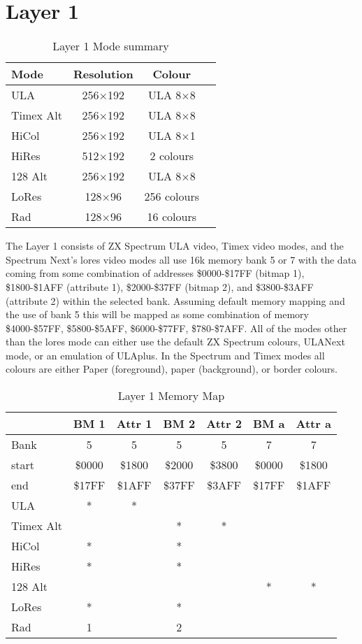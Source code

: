 \section{Layer 1}
\begin{table}[h]
\caption{Layer 1 Mode summary}
\centering
\begin{tabular}{|l|c|c|c|}
  \hline Mode & Resolution & Colour \\
  \hline ULA & 256$\times$192 & ULA 8$\times$8\\
  \hline Timex Alt & 256$\times$192 & ULA 8$\times$8\\
  \hline HiCol & 256$\times$192 & ULA 8$\times$1\\
  \hline HiRes & 512$\times$192 & 2 colours \\
  \hline 128 Alt & 256$\times$192 & ULA 8$\times$8\\
  \hline LoRes & 128$\times$96 & 256 colours \\
  \hline Rad & 128$\times$96 & 16 colours \\\hline
\end{tabular}
\end{table}

The Layer 1 consists of ZX Spectrum ULA video, Timex video modes, and
the Spectrum Next’s lores video modes all use 16k memory bank 5 or 7
with the data coming from some combination of addresses \$0000-\$17FF
(bitmap 1), \$1800-\$1AFF (attribute 1), \$2000-\$37FF (bitmap 2), and
\$3800-\$3AFF (attribute 2) within the selected bank.  Assuming
default memory mapping and the use of bank 5 this will be mapped as
some combination of memory \$4000-\$57FF, \$5800-\$5AFF,
\$6000-\$77FF, \$780-\$7AFF. All of the modes other than the lores
mode can either use the default ZX Spectrum colours, ULANext mode, or
an emulation of ULAplus. In the Spectrum and Timex modes all colours are
either Paper (foreground), paper (background), or border colours.

\begin{table}[h]
  \caption{Layer 1 Memory Map}
  \centering
  \begin{tabular}{| l | c | c | c | c | c | c |}
    \hline & BM 1 & Attr 1 & BM 2 & Attr 2 & BM a & Attr a\\
    \hline Bank & 5 & 5 & 5 & 5 & 7 & 7\\
    start & \$0000 & \$1800 & \$2000 & \$3800 & \$0000 & \$1800\\
    end & \$17FF & \$1AFF & \$37FF & \$3AFF & \$17FF & \$1AFF\\\hline
    \hline ULA & * & * & & & &\\
    \hline Timex Alt & & & * & * & &\\
    \hline HiCol & * & & * & & &\\
    \hline HiRes & * & & * & & &\\
    \hline 128 Alt & & & & & * & *\\
    \hline LoRes & * & & * & & &\\
    \hline Rad & 1 & & 2 & & &\\\hline
  \end{tabular}
\end{table}


